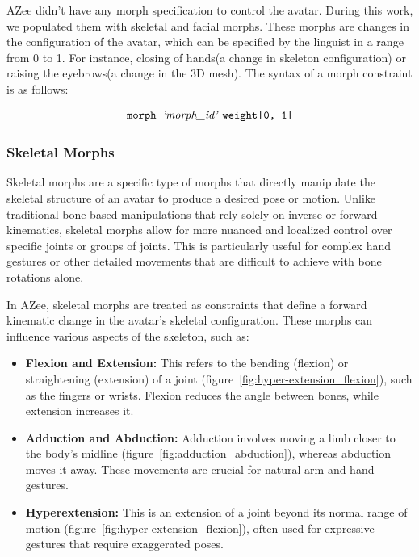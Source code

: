 \documentclass[../../main.tex]{subfiles}
\begin{document}
{AZee didn't have any morph specification to control the avatar. During this work, we populated them with skeletal and facial morphs. These morphs are changes in the configuration of the avatar, which can be specified by the linguist in a range from 0 to 1. For instance, closing of hands(a change in skeleton configuration) or raising the eyebrows(a change in the 3D mesh). The syntax of a morph constraint is as follows:

\[
\texttt{morph } \text{\emph{'morph\_id'}} \ \texttt{weight[0, 1]}
\]

\subsubsection{Skeletal Morphs}
\label{ch:avatar_creation_pose_synthesis:proc_rig_signing_avatars:morph_constraints:skel_morphs}

Skeletal morphs are a specific type of morphs that directly manipulate the skeletal structure of an avatar to produce a desired pose or motion. Unlike traditional bone-based manipulations that rely solely on inverse or forward kinematics, skeletal morphs allow for more nuanced and localized control over specific joints or groups of joints. This is particularly useful for complex hand gestures or other detailed movements that are difficult to achieve with bone rotations alone.

In AZee, skeletal morphs are treated as constraints that define a forward kinematic change in the avatar's skeletal configuration. These morphs can influence various aspects of the skeleton, such as:

\begin{itemize}
    \item \textbf{Flexion and Extension:} This refers to the bending (flexion) or straightening (extension) of a joint (figure~\ref{fig:hyper-extension_flexion}), such as the fingers or wrists. Flexion reduces the angle between bones, while extension increases it.
    \item \textbf{Adduction and Abduction:} Adduction involves moving a limb closer to the body's midline (figure~\ref{fig:adduction_abduction}), whereas abduction moves it away. These movements are crucial for natural arm and hand gestures.
    \item \textbf{Hyperextension:} This is an extension of a joint beyond its normal range of motion (figure~\ref{fig:hyper-extension_flexion}), often used for expressive gestures that require exaggerated poses.
\end{itemize}

}
\end{document}
